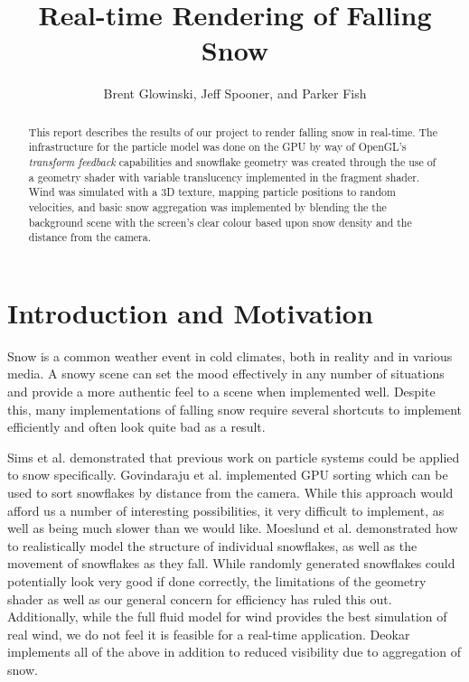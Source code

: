 \documentclass[conference]{acmsiggraph}
\title{Real-time Rendering of Falling Snow}
\author{Brent Glowinski, Jeff Spooner, and Parker Fish}
\begin{document}
\maketitle

\begin{abstract}
This report describes the results of our project to render falling snow in real-time. The infrastructure for the particle model was done on the GPU by way of OpenGL's \textit{transform feedback} capabilities and snowflake geometry was created through the use of a geometry shader with variable translucency implemented in the fragment shader. Wind was simulated with a 3D texture, mapping particle positions to random velocities, and basic snow aggregation was implemented by blending the the background scene with the screen's clear colour based upon snow density and the distance from the camera.

\end{abstract}

\keywordlist

\copyrightspace

\section{Introduction and Motivation}
Snow is a common weather event in cold climates, both in reality and in various media. A snowy scene can set the mood effectively in any number of situations and provide a more authentic feel to a scene when implemented well. Despite this, many implementations of falling snow require several shortcuts to implement efficiently and often look quite bad as a result.

Sims et al. \cite{sims90} demonstrated that previous work on particle systems could be applied to snow specifically. Govindaraju et al. \cite{govindaraju05} implemented GPU sorting which can be used to sort snowflakes by distance from the camera. While this approach would afford us a number of interesting possibilities, it very difficult to implement, as well as being much slower than we would like. Moeslund et al. \cite{moeslund05} demonstrated how to realistically model the structure of individual snowflakes, as well as the movement of snowflakes as they fall. While randomly generated snowflakes could potentially look very good if done correctly, the limitations of the geometry shader as well as our general concern for efficiency has ruled this out. Additionally, while the full fluid model for wind provides the best simulation of real wind, we do not feel it is feasible for a real-time application. Deokar \cite{deokar09} implements all of the above in addition to reduced visibility due to aggregation of snow. 
\end{document}
